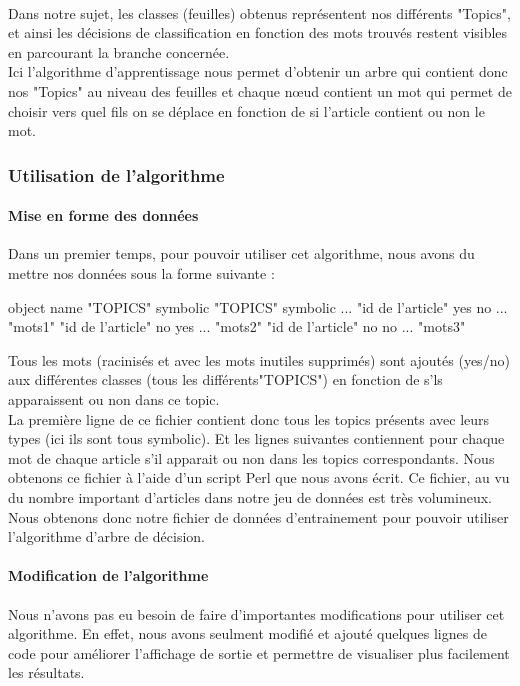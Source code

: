 \paragraph{}
Dans notre sujet,  les classes (feuilles) obtenus représentent nos différents "Topics",  et ainsi  les décisions de classification en fonction des mots trouvés restent visibles en parcourant la branche concernée.\\
Ici l'algorithme d'apprentissage nous permet d'obtenir un arbre qui contient donc nos "Topics" au niveau des feuilles et chaque nœud contient un mot qui permet de choisir vers quel fils on se déplace en fonction de si l'article contient ou non le mot.  


\subsubsection{Utilisation de l'algorithme}

\paragraph{Mise en forme des données}  
Dans un premier temps, pour pouvoir utiliser cet algorithme, nous avons du mettre nos données sous la forme suivante :

object name "TOPICS" symbolic "TOPICS" symbolic ...
"id de l'article" yes no ... "mots1"
"id de l'article" no yes ... "mots2"
"id de l'article" no no ... "mots3"

Tous les mots (racinisés et avec les mots inutiles supprimés) sont ajoutés (yes/no) aux différentes classes (tous les différents"TOPICS") en fonction de s'ls apparaissent ou non dans ce topic.\\
La première ligne de ce fichier contient donc tous les topics présents avec leurs types (ici ils sont tous symbolic). Et les lignes suivantes contiennent pour chaque mot de chaque article s'il apparait ou non dans les topics correspondants.
Nous obtenons ce fichier à l'aide d'un script Perl que nous avons écrit. Ce fichier, au vu du nombre important d'articles dans notre jeu de données est très volumineux. Nous obtenons donc notre fichier de données d'entrainement pour pouvoir utiliser l'algorithme d'arbre de décision.

\paragraph{Modification de l'algorithme}  
Nous n'avons pas eu besoin de faire d'importantes modifications pour utiliser cet algorithme. En effet, nous avons seulment modifié et ajouté quelques lignes de code pour améliorer l'affichage de sortie et permettre de visualiser plus facilement les résultats.

